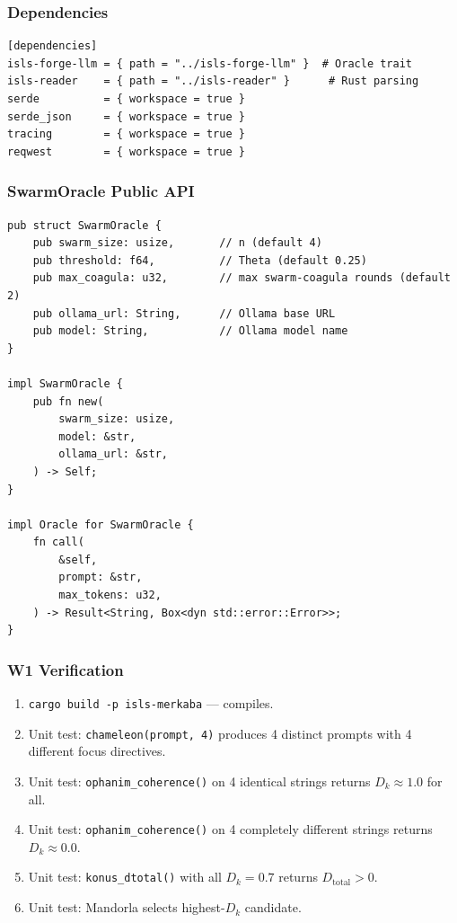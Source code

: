\documentclass[11pt,a4paper]{article}
\begin{document}
\subsubsection{Dependencies}

\begin{lstlisting}[style=toml]
[dependencies]
isls-forge-llm = { path = "../isls-forge-llm" }  # Oracle trait
isls-reader    = { path = "../isls-reader" }      # Rust parsing
serde          = { workspace = true }
serde_json     = { workspace = true }
tracing        = { workspace = true }
reqwest        = { workspace = true }
\end{lstlisting}

\subsubsection{SwarmOracle Public API}

\begin{lstlisting}[style=rust]
pub struct SwarmOracle {
    pub swarm_size: usize,       // n (default 4)
    pub threshold: f64,          // Theta (default 0.25)
    pub max_coagula: u32,        // max swarm-coagula rounds (default 2)
    pub ollama_url: String,      // Ollama base URL
    pub model: String,           // Ollama model name
}

impl SwarmOracle {
    pub fn new(
        swarm_size: usize,
        model: &str,
        ollama_url: &str,
    ) -> Self;
}

impl Oracle for SwarmOracle {
    fn call(
        &self,
        prompt: &str,
        max_tokens: u32,
    ) -> Result<String, Box<dyn std::error::Error>>;
}
\end{lstlisting}

\subsubsection{W1 Verification}

\begin{enumerate}[nosep]
\item \texttt{cargo build -p isls-merkaba} --- compiles.
\item Unit test: \texttt{chameleon(prompt, 4)} produces 4 
      distinct prompts with 4 different focus directives.
\item Unit test: \texttt{ophanim\_coherence()} on 4 identical 
      strings returns $D_k \approx 1.0$ for all.
\item Unit test: \texttt{ophanim\_coherence()} on 4 completely 
      different strings returns $D_k \approx 0.0$.
\item Unit test: \texttt{konus\_dtotal()} with all $D_k = 0.7$ 
      returns $D_\text{total} > 0$.
\item Unit test: Mandorla selects highest-$D_k$ candidate.
\end{enumerate}
\end{document}
